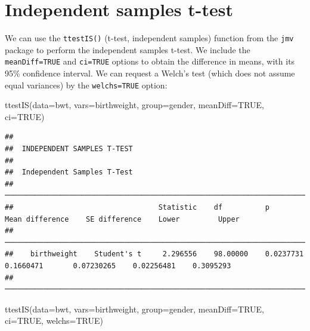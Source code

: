 \documentclass[
]{memoir}
\newenvironment{Shaded}{\begin{snugshade}}{\end{snugshade}}
\newcommand{\AttributeTok}[1]{\textcolor[rgb]{0.77,0.63,0.00}{#1}}
\newcommand{\ConstantTok}[1]{\textcolor[rgb]{0.00,0.00,0.00}{#1}}
\newcommand{\FunctionTok}[1]{\textcolor[rgb]{0.00,0.00,0.00}{#1}}
\newcommand{\NormalTok}[1]{#1}
\begin{document}
\hypertarget{independent-samples-t-test}{%
\section{Independent samples t-test}\label{independent-samples-t-test}}

We can use the \texttt{ttestIS()} (t-test, independent samples) function from the \texttt{jmv} package to perform the independent samples t-test. We include the \texttt{meanDiff=TRUE} and \texttt{ci=TRUE} options to obtain the difference in means, with its 95\% confidence interval. We can request a Welch's test (which does not assume equal variances) by the \texttt{welchs=TRUE} option:

\begin{Shaded}
\begin{Highlighting}[]
\FunctionTok{ttestIS}\NormalTok{(}\AttributeTok{data=}\NormalTok{bwt, }\AttributeTok{vars=}\NormalTok{birthweight, }\AttributeTok{group=}\NormalTok{gender, }\AttributeTok{meanDiff=}\ConstantTok{TRUE}\NormalTok{, }\AttributeTok{ci=}\ConstantTok{TRUE}\NormalTok{)}
\end{Highlighting}
\end{Shaded}

\begin{verbatim}
## 
##  INDEPENDENT SAMPLES T-TEST
## 
##  Independent Samples T-Test                                                                                                          
##  ─────────────────────────────────────────────────────────────────────────────────────────────────────────────────────────────────── 
##                                  Statistic    df          p            Mean difference    SE difference    Lower         Upper       
##  ─────────────────────────────────────────────────────────────────────────────────────────────────────────────────────────────────── 
##    birthweight    Student's t     2.296556    98.00000    0.0237731          0.1660471       0.07230265    0.02256481    0.3095293   
##  ───────────────────────────────────────────────────────────────────────────────────────────────────────────────────────────────────
\end{verbatim}

\begin{Shaded}
\begin{Highlighting}[]
\FunctionTok{ttestIS}\NormalTok{(}\AttributeTok{data=}\NormalTok{bwt, }\AttributeTok{vars=}\NormalTok{birthweight, }\AttributeTok{group=}\NormalTok{gender, }\AttributeTok{meanDiff=}\ConstantTok{TRUE}\NormalTok{, }\AttributeTok{ci=}\ConstantTok{TRUE}\NormalTok{, }\AttributeTok{welchs=}\ConstantTok{TRUE}\NormalTok{)}
\end{Highlighting}
\end{Shaded}
\end{document}
